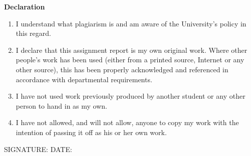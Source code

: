 {\textbf{Declaration}
\begin{enumerate}
\item I understand what plagiarism is and am aware of the University's
  policy in this regard.
\item I declare that this assignment report is my own original work.
  Where other people's work has been used (either from a printed source,
  Internet or any other source), this has been properly acknowledged and
  referenced in accordance with departmental requirements.
\item I have not used work previously produced by another student or any
  other person to hand in as my own.
\item I have not allowed, and will not allow, anyone to copy my work with
  the intention of passing it off as his or her own work.
\end{enumerate}

\vspace*{1cm}

SIGNATURE: \makebox[3in]{\hrulefill} \quad DATE: \makebox[1.5in]{\hrulefill}
}

\newpage


